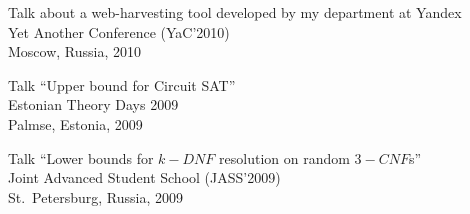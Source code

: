\begin{innerlist}
 \item Talk about a web-harvesting tool developed by my department at Yandex\\
       Yet Another Conference (YaC'2010)\\
       Moscow, Russia, 2010
 \item Talk ``Upper bound for Circuit SAT''\\
       Estonian Theory Days 2009\\
       Palmse, Estonia, 2009
 \item Talk ``Lower bounds for $k-DNF$ resolution on random $3-CNF$s''\\
       Joint Advanced Student School (JASS'2009)\\
       St.~Petersburg, Russia, 2009
\end{innerlist}
